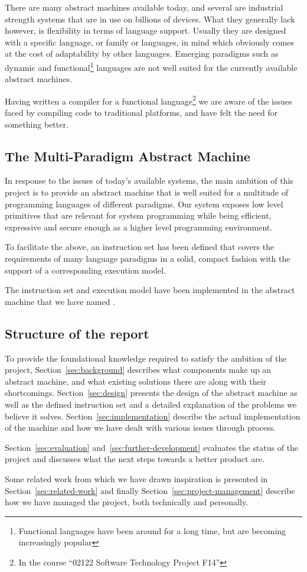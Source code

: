 There are many abstract machines available today, and several are industrial
strength systems that are in use on billions of devices. What they generally
lack however, is flexibility in terms of language support. Usually they are
designed with a specific language, or family or languages, in mind which
obviously comes at the cost of adaptability by other languages. Emerging
paradigms such as dynamic and functional\footnote{Functional languages have been
  around for a long time, but are becoming increasingly popular} languages are
not well suited for the currently available abstract machines.

Having written a compiler for a functional language\footnote{In the course
  ``02122 Software Technology Project F14''} we are aware of the issues faced by
compiling code to traditional platforms, and have felt the need for something
better.

\subsection{The Multi-Paradigm Abstract Machine}

In response to the issues of today's available systems, the main ambition of
this project is to provide an abstract machine that is well suited for a
multitude of programming languages of different paradigms. Our system exposes
low level primitives that are relevant for system programming while being
efficient, expressive and secure enough as a higher level programming
environment.

To facilitate the above, an instruction set has been defined that covers the
requirements of many language paradigms in a solid, compact fashion with the
support of a corresponding execution model.

The instruction set and execution model have been implemented in the abstract
machine that we have named \thename{}.

\subsection{Structure of the report}

To provide the foundational knowledge required to satisfy the ambition of the
project, Section~\ref{sec:background} describes what components make up an
abstract machine, and what existing solutions there are along with their
shortcomings. Section~\ref{sec:design} presents the design of the abstract
machine as well as the defined instruction set and a detailed explanation of the
problems we believe it solves. Section~\ref{sec:implementation} describe the
actual implementation of the machine and how we have dealt with various issues
through process.

Section~\ref{sec:evaluation} and~\ref{sec:further-development} evaluates
the status of the project and discusses what the next steps towards a better
product are.

Some related work from which we have drawn inspiration is presented in
Section~\ref{sec:related-work} and finally Section~\ref{sec:project-management}
describe how we have managed the project, both technically and personally.
